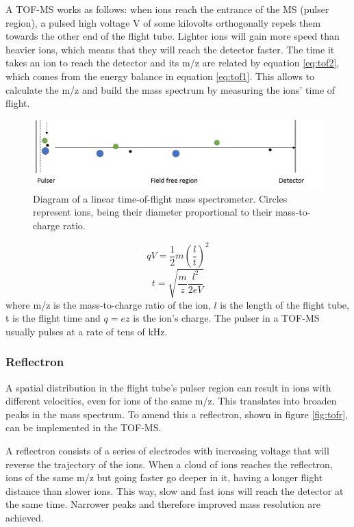 A TOF-MS works as follows: when ions reach the entrance of the MS (pulser region), a pulsed high voltage V of some kilovolts orthogonally repels them towards the other end of the flight tube. Lighter ions will gain more speed than heavier ions, which means that they will reach the detector faster. The time it takes an ion to reach the detector and its m/z are related by equation \ref{eq:tof2}, which comes from the energy balance in equation \ref{eq:tof1}. This allows to calculate the m/z and build the mass spectrum by measuring the ions' time of flight. 

\begin{figure}%
\centering
\includegraphics[width=0.8\linewidth]{pics/tofms.png}
\centering
\caption{Diagram of a linear time-of-flight mass spectrometer. Circles represent ions, being their diameter proportional to their mass-to-charge ratio.}
\label{fig:tof}
\end{figure}

\begin{equation}
\label{eq:tof1}
qV =  \frac{1}{2} m\left(\frac{l}{t}\right)^2
\end{equation}
\begin{equation}
\label{eq:tof2}
t= \sqrt{\frac{m}{z} \frac{l^2}{2eV}}
\end{equation}
where m/z is the mass-to-charge ratio of the ion, $l$ is the length of the flight tube, t is the flight time and $q = e z$ is the ion's charge. The pulser in a TOF-MS usually pulses at a rate of tens of kHz. 

\subsubsection{Reflectron}
A spatial distribution in the flight tube's pulser region can result in ions with different velocities, even for ions of the same m/z. This translates into broaden peaks in the mass spectrum. To amend this a reflectron, shown in figure \ref{fig:tofr}, can be implemented in the TOF-MS.

A reflectron consists of a series of electrodes with increasing voltage that will reverse the trajectory of the ions. When a cloud of ions reaches the reflectron, ions of the same m/z but going faster go deeper in it, having a longer flight distance than slower ions. This way, slow and fast ions will reach the detector at the same time. Narrower peaks and therefore improved mass resolution are achieved.

